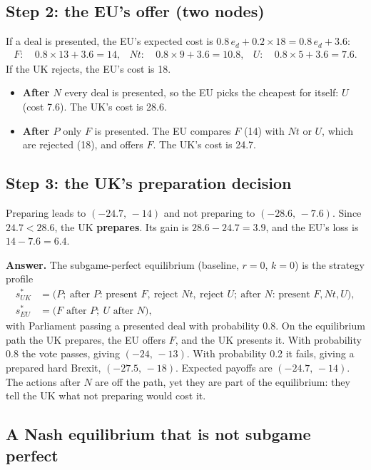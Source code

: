 \documentclass[11pt,a4paper]{article}
\newcommand{\answer}[1]{\begin{tcolorbox}[colback=ans!5,colframe=ans,boxrule=0.6pt,
  left=5pt,right=5pt,top=3pt,bottom=3pt]\textbf{Answer.} #1\end{tcolorbox}}
\newcommand{\Nt}{\mathit{Nt}}
\newcommand{\dF}{\mathit{F}}
\newcommand{\dU}{\mathit{U}}
\begin{document}
\subsection{Step 2: the EU's offer (two nodes)}

If a deal is presented, the EU's expected cost is $0.8\,e_d+0.2\times18=0.8\,e_d+3.6$:
\begin{align*}
  \dF:&\ 0.8\times13+3.6=14, & \Nt:&\ 0.8\times9+3.6=10.8, & \dU:&\ 0.8\times5+3.6=7.6 .
\end{align*}
If the UK rejects, the EU's cost is 18.
\begin{itemize}
  \item \textbf{After $N$} every deal is presented, so the EU picks the cheapest for itself:
    $\dU$ (cost 7.6). The UK's cost is 28.6.
  \item \textbf{After $P$} only $\dF$ is presented. The EU compares $\dF$ (14) with $\Nt$ or $\dU$, which are
    rejected (18), and offers $\dF$. The UK's cost is 24.7.
\end{itemize}

\subsection{Step 3: the UK's preparation decision}

Preparing leads to $(-24.7,\,-14)$ and not preparing to $(-28.6,\,-7.6)$. Since $24.7<28.6$, the UK
\textbf{prepares}. Its gain is $28.6-24.7=3.9$, and the EU's loss is $14-7.6=6.4$.

\answer{The subgame-perfect equilibrium (baseline, $r=0$, $k=0$) is the strategy profile
\begin{align*}
  s^*_{UK} &= \bigl(P;\ \text{after }P\text{: present }\dF,\ \text{reject }\Nt,\ \text{reject }\dU;\
              \text{after }N\text{: present }\dF,\Nt,\dU\bigr),\\
  s^*_{EU} &= \bigl(\dF\text{ after }P;\ \dU\text{ after }N\bigr),
\end{align*}
with Parliament passing a presented deal with probability 0.8. On the equilibrium path the UK prepares,
the EU offers $\dF$, and the UK presents it. With probability 0.8 the vote passes, giving
$(-24,\,-13)$. With probability 0.2 it fails, giving a prepared hard Brexit, $(-27.5,\,-18)$.
Expected payoffs are $(-24.7,\,-14)$. The actions after $N$ are off the path, yet they are part
of the equilibrium: they tell the UK what not preparing would cost it.}

\subsection{A Nash equilibrium that is not subgame perfect}
\end{document}
